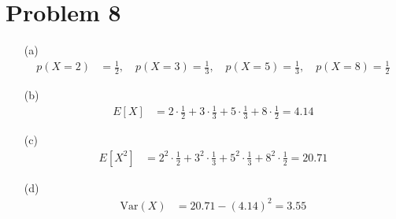 \documentclass{article}
\begin{document}
\section*{Problem 8}
\begin{enumerate}
    \item[(a)]
    \begin{align*}
        p(X=2) &= \frac{1}{2}, \quad p(X=3) = \frac{1}{3}, \quad p(X=5) = \frac{1}{3}, \quad p(X=8) = \frac{1}{2}
    \end{align*}

    \item[(b)]
    \begin{align*}
        E[X] &= 2 \cdot \frac{1}{2} + 3 \cdot \frac{1}{3} + 5 \cdot \frac{1}{3} + 8 \cdot \frac{1}{2} = 4.14
    \end{align*}

    \item[(c)]
    \begin{align*}
        E[X^2] &= 2^2 \cdot \frac{1}{2} + 3^2 \cdot \frac{1}{3} + 5^2 \cdot \frac{1}{3} + 8^2 \cdot \frac{1}{2} = 20.71
    \end{align*}

    \item[(d)]
    \begin{align*}
        \text{Var}(X) &= 20.71 - (4.14)^2 = 3.55
    \end{align*}
\end{enumerate}
\end{document}
